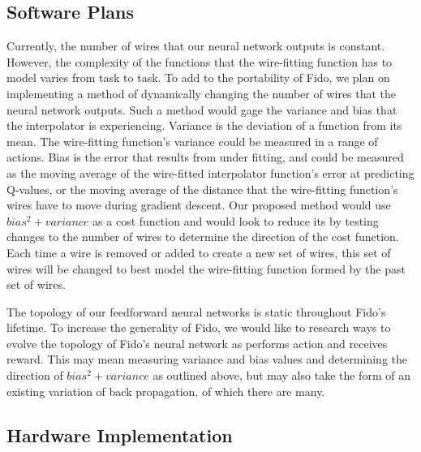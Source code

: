 \subsection{Software Plans}

Currently, the number of wires that our neural network outputs is constant. However, the complexity of the functions that the wire-fitting function has to model varies from task to task. To add to the portability of Fido, we plan on implementing a method of dynamically changing the number of wires that the neural network outputs. Such a method would gage the variance and bias that the interpolator is experiencing. Variance is the deviation of a function from its mean. The wire-fitting function's variance could be measured in a range of actions. Bias is the error that results from under fitting, and could be measured as the moving average of the wire-fitted interpolator function's error at predicting Q-values, or the moving average of the distance that the wire-fitting function's wires have to move during gradient descent. Our proposed method would use $bias^2 + variance$ as a cost function and would look to reduce its by testing changes to the number of wires to determine the direction of the cost function. Each time a wire is removed or added to create a new set of wires, this set of wires will be changed to best model the wire-fitting function formed by the past set of wires.

The topology of our feedforward neural networks is static throughout Fido's lifetime. To increase the generality of Fido, we would like to research ways to evolve the topology of Fido's neural network as performs action and receives reward. This may mean measuring variance and bias values and determining the direction of $bias^2 + variance$ as outlined above, but may also take the form of an existing variation of back propagation, of which there are many.

\subsection{Hardware Implementation}